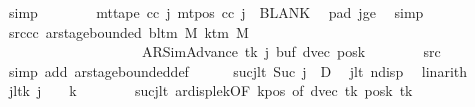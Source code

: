 \begin{isabellebody}
\ simp\isanewline
\ \ \ \ \ \ \isamarkupfalse%
\ {\isachardoublequoteopen}mt{\isacharunderscore}{\kern0pt}tape\ cc\ j{\isacharprime}{\kern0pt}\ {\isacharparenleft}{\kern0pt}mt{\isacharunderscore}{\kern0pt}pos\ cc\ j{\isacharprime}{\kern0pt}{\isacharparenright}{\kern0pt}\ {\isacharequal}{\kern0pt}\ BLANK{}{\isachardoublequoteclose}\ \isamarkupfalse%
\ pad{}\ jge\ \isamarkupfalse%
\ simp\isanewline
\ \ \ \ \isamarkupfalse%
\isanewline
\ \ \ \ \isamarkupfalse%
\ src{\isacharunderscore}{\kern0pt}cc{\isacharcolon}{\kern0pt}\ {\isachardoublequoteopen}ar{\isacharunderscore}{\kern0pt}stage{\isacharunderscore}{\kern0pt}bounded\ {\isacharparenleft}{\kern0pt}bl{\isacharunderscore}{\kern0pt}tm\ M{\isacharparenright}{\kern0pt}\ {\isacharparenleft}{\kern0pt}k{\isacharunderscore}{\kern0pt}tm\ M{\isacharparenright}{\kern0pt}\isanewline
\ \ \ \ \ \ \ \ \ \ \ \ \ \ \ \ \ \ \ \ {\isacharparenleft}{\kern0pt}AR{\isacharunderscore}{\kern0pt}SimAdvance{\isacharcomma}{\kern0pt}\ tk{\isacharcomma}{\kern0pt}\ j{\isacharcomma}{\kern0pt}\ buf{\isacharcomma}{\kern0pt}\ dvec{\isacharcomma}{\kern0pt}\ posk{\isacharparenright}{\kern0pt}{\isachardoublequoteclose}\isanewline
\ \ \ \ \ \ \isamarkupfalse%
\ src{}\ \isamarkupfalse%
\ {\isacharparenleft}{\kern0pt}simp\ add{\isacharcolon}{\kern0pt}\ ar{\isacharunderscore}{\kern0pt}stage{\isacharunderscore}{\kern0pt}bounded{\isacharunderscore}{\kern0pt}def{\isacharparenright}{\kern0pt}\isanewline
\ \ \ \ \isamarkupfalse%
\ sucj{\isacharunderscore}{\kern0pt}lt{\isacharcolon}{\kern0pt}\ {\isachardoublequoteopen}Suc\ j\ {\isacharless}{\kern0pt}\ {\isacharquery}{\kern0pt}D{\isachardoublequoteclose}\ \isamarkupfalse%
\ jlt\ ndisp\ \isamarkupfalse%
\ linarith\isanewline
\ \ \ \ \isamarkupfalse%
\ j{\isacharunderscore}{\kern0pt}lt{}k{\isacharcolon}{\kern0pt}\ {\isachardoublequoteopen}j\ {\isacharless}{\kern0pt}\ {}\ {\isacharasterisk}{\kern0pt}\ {\isacharquery}{\kern0pt}k{\isachardoublequoteclose}\isanewline
\ \ \ \ \ \ \isamarkupfalse%
\ sucj{\isacharunderscore}{\kern0pt}lt\ ar{\isacharunderscore}{\kern0pt}disp{\isacharunderscore}{\kern0pt}le{\isacharunderscore}{\kern0pt}{}k{\isacharbrackleft}{\kern0pt}OF\ kpos{\isacharcomma}{\kern0pt}\ of\ {\isachardoublequoteopen}dvec\ tk{\isachardoublequoteclose}\ {\isachardoublequoteopen}posk\ tk{\isachardoublequoteclose}{\isacharbrackright}{\kern0pt}\ \isamarkupfalse%

\end{isabellebody}
